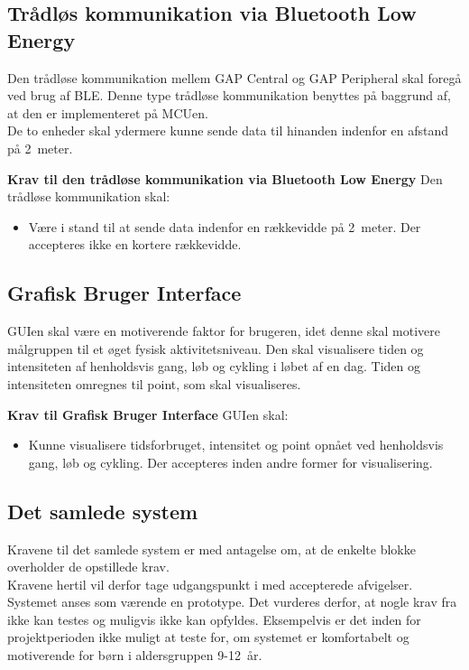 \subsection{Trådløs kommunikation via Bluetooth Low Energy}\label{krav_BLE}
Den trådløse kommunikation mellem GAP Central og GAP Peripheral skal foregå ved brug af BLE. Denne type trådløse kommunikation benyttes på baggrund af, at den er implementeret på MCUen.\\
De to enheder skal ydermere kunne sende data til hinanden indenfor en afstand på 2~meter. 

\textbf{Krav til den trådløse kommunikation via Bluetooth Low Energy} \newline 
Den trådløse kommunikation skal:
\begin{itemize}
	\item Være i stand til at sende data indenfor en rækkevidde på 2~meter. Der accepteres ikke en kortere rækkevidde.
\end{itemize}

\subsection{Grafisk Bruger Interface}\label{krav_GUI}
GUIen skal være en motiverende faktor for brugeren, idet denne skal motivere målgruppen til et øget fysisk aktivitetsniveau. Den skal visualisere tiden og intensiteten af henholdsvis gang, løb og cykling i løbet af en dag. Tiden og intensiteten omregnes til point, som skal visualiseres.

\textbf{Krav til Grafisk Bruger Interface} \newline 
GUIen skal:
\begin{itemize}
	\item Kunne visualisere tidsforbruget, intensitet og point opnået ved henholdsvis gang, løb og cykling. Der accepteres inden andre former for visualisering.
\end{itemize}

\subsection{Det samlede system} \label{krav_samlet_sys}
Kravene til det samlede system er med antagelse om, at de enkelte blokke overholder de opstillede krav.\\
Kravene hertil vil derfor tage udgangspunkt i  med accepterede afvigelser. Systemet anses som værende en prototype. Det vurderes derfor, at nogle krav fra  ikke kan testes og muligvis ikke kan opfyldes. Eksempelvis er det inden for projektperioden ikke muligt at teste for, om systemet er komfortabelt og motiverende for børn i aldersgruppen 9-12~år.

